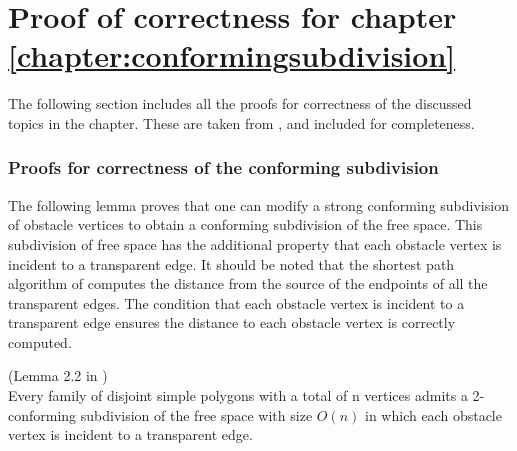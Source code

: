 \chapter{Proof of correctness for chapter \ref{chapter:conformingsubdivision}}

The following section includes all the proofs for correctness of the discussed topics in the chapter. These are taken from 
\cite{HershbergerS99}, and included for completeness.

\subsection{Proofs for correctness of the conforming subdivision}

The following lemma proves that one can modify a strong conforming subdivision of 
obstacle vertices to obtain a conforming subdivision of the free space. This 
subdivision of free space has the additional property that each obstacle vertex is 
incident to a transparent edge. It should be noted that the shortest path algorithm of 
\cite{HershbergerS99} computes the distance from the source of the endpoints of all 
the transparent edges. The condition that each obstacle vertex is incident to a 
transparent edge ensures the distance to each obstacle vertex is correctly computed.

\begin{Lemma}(Lemma 2.2 in \cite{HershbergerS99})
\label{lemma:admitsa2conformingsubdivision}\\
Every family of disjoint simple polygons with a total of n vertices admits a 2-conforming
subdivision of the free space with size $O(n)$ in which each obstacle vertex is incident
to a transparent edge.
\end{Lemma}

